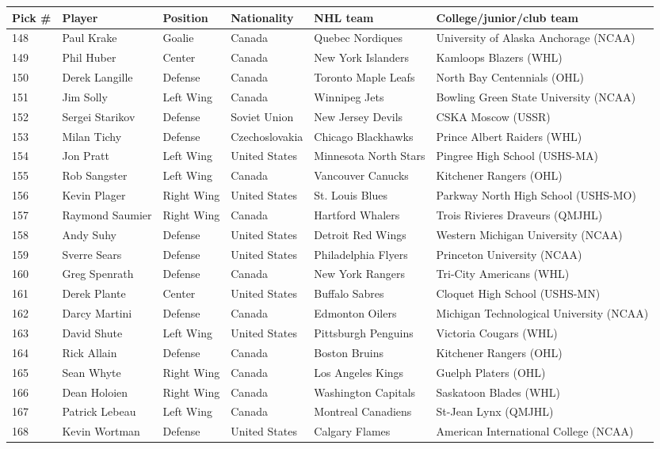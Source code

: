 \documentclass{article}
\begin{document}
\begin{tabular}{llllll}
\toprule
Pick \# & Player & Position & Nationality & NHL team & College/junior/club team \\
\midrule
148 & Paul Krake & Goalie & Canada & Quebec Nordiques & University of Alaska Anchorage (NCAA) \\
149 & Phil Huber & Center & Canada & New York Islanders & Kamloops Blazers (WHL) \\
150 & Derek Langille & Defense & Canada & Toronto Maple Leafs & North Bay Centennials (OHL) \\
151 & Jim Solly & Left Wing & Canada & Winnipeg Jets & Bowling Green State University (NCAA) \\
152 & Sergei Starikov & Defense & Soviet Union & New Jersey Devils & CSKA Moscow (USSR) \\
153 & Milan Tichy & Defense & Czechoslovakia & Chicago Blackhawks & Prince Albert Raiders (WHL) \\
154 & Jon Pratt & Left Wing & United States & Minnesota North Stars & Pingree High School (USHS-MA) \\
155 & Rob Sangster & Left Wing & Canada & Vancouver Canucks & Kitchener Rangers (OHL) \\
156 & Kevin Plager & Right Wing & United States & St. Louis Blues & Parkway North High School (USHS-MO) \\
157 & Raymond Saumier & Right Wing & Canada & Hartford Whalers & Trois Rivieres Draveurs (QMJHL) \\
158 & Andy Suhy & Defense & United States & Detroit Red Wings & Western Michigan University (NCAA) \\
159 & Sverre Sears & Defense & United States & Philadelphia Flyers & Princeton University (NCAA) \\
160 & Greg Spenrath & Defense & Canada & New York Rangers & Tri-City Americans (WHL) \\
161 & Derek Plante & Center & United States & Buffalo Sabres & Cloquet High School (USHS-MN) \\
162 & Darcy Martini & Defense & Canada & Edmonton Oilers & Michigan Technological University (NCAA) \\
163 & David Shute & Left Wing & United States & Pittsburgh Penguins & Victoria Cougars (WHL) \\
164 & Rick Allain & Defense & Canada & Boston Bruins & Kitchener Rangers (OHL) \\
165 & Sean Whyte & Right Wing & Canada & Los Angeles Kings & Guelph Platers (OHL) \\
166 & Dean Holoien & Right Wing & Canada & Washington Capitals & Saskatoon Blades (WHL) \\
167 & Patrick Lebeau & Left Wing & Canada & Montreal Canadiens & St-Jean Lynx (QMJHL) \\
168 & Kevin Wortman & Defense & United States & Calgary Flames & American International College (NCAA) \\
\bottomrule
\end{tabular}
\end{document}
